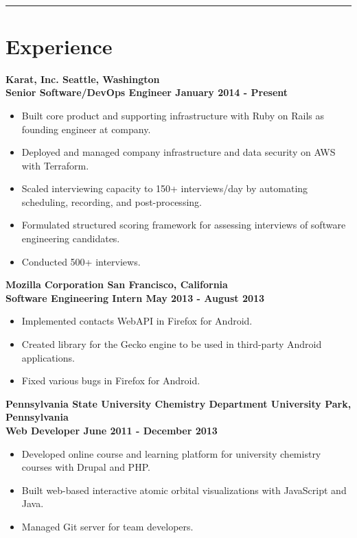 \documentclass[letterpaper]{article}
\newcommand{\setfontsize}{\fontsize{11.5}{16}\selectfont}
\newcommand{\sectionrule}[1] {
  \noindent\rule{\textwidth}{.1mm}
  \vspace{-11mm}
  \section{#1}
}
\newenvironment{indentsection}
  {\begin{adjustwidth}{10mm}{0pt}}
  {\end{adjustwidth}}
\newcommand{\job}[5] {
  \noindent\textbf{#1 \hfill #2}\\
  \textbf{#3 \hfill #4 - #5}

  \vspace{1mm}
}
\begin{document}
  \setfontsize

  \vspace{2mm}\\

  \sectionrule{Experience}

  \begin{indentsection}
    \job{Karat, Inc.}{Seattle, Washington}{Senior Software/DevOps Engineer}{January 2014}{Present}
    \begin{itemize}
      \item Built core product and supporting infrastructure with Ruby on Rails as founding engineer at company.
      \item Deployed and managed company infrastructure and data security on AWS with Terraform.
      \item Scaled interviewing capacity to 150+ interviews/day by automating scheduling, recording, and post-processing.
      \item Formulated structured scoring framework for assessing interviews of software engineering candidates.
      \item Conducted 500+ interviews.
    \end{itemize}

    \vspace{3mm}

    \job{Mozilla Corporation}{San Francisco, California}{Software Engineering Intern}{May 2013}{August 2013}
    \begin{itemize}
      \item Implemented contacts WebAPI in Firefox for Android.
      \item Created library for the Gecko engine to be used in third-party Android applications.
      \item Fixed various bugs in Firefox for Android.
    \end{itemize}

    \vspace{3mm}

    \job{Pennsylvania State University Chemistry Department}{University Park, Pennsylvania}{Web Developer}{June 2011}{December 2013}
    \begin{itemize}
      \item Developed online course and learning platform for university chemistry courses with Drupal and PHP.
      \item Built web-based interactive atomic orbital visualizations with JavaScript and Java.
      \item Managed Git server for team developers.
    \end{itemize}
  \end{indentsection}
\end{document}
